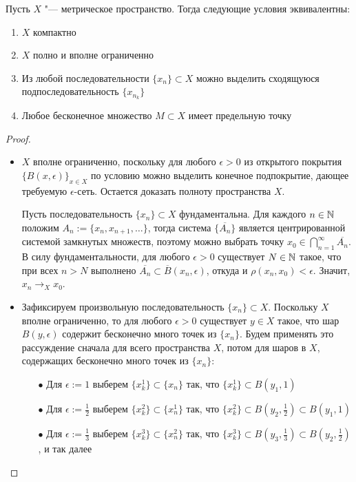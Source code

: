 \begin{theorem}\label{thm3.2}
    Пусть $X$ "--- метрическое пространство. Тогда следующие условия эквивалентны:
    \begin{enumerate}
        \item $X$ компактно
        \item $X$ полно и вполне ограниченно
        \item Из любой последовательности $\{x_n\} \subset X$ можно выделить сходящуюся подпоследовательность $\{x_{n_k}\}$
        \item Любое бесконечное множество $M \subset X$ имеет предельную точку
    \end{enumerate}
\end{theorem}

\begin{proof}~
    \begin{itemize}
        \item{}$X$ вполне ограниченно, поскольку для любого $\epsilon > 0$ из открытого покрытия $\{B(x, \epsilon)\}_{x \in X}$ по условию можно выделить конечное подпокрытие, дающее требуемую $\epsilon$-сеть. Остается доказать полноту пространства $X$.
        
        Пусть последовательность $\{x_n\} \subset X$ фундаментальна. Для каждого $n \in \mathbb{N}$ положим $A_n := \{x_n, x_{n+1}, \dotsc \}$, тогда система $\{\overline{A_n}\}$ является центрированной системой замкнутых множеств, поэтому можно выбрать точку $x_0 \in \bigcap_{n=1}^\infty \overline{A_n}$. В силу фундаментальности, для любого $\epsilon > 0$ существует $N \in \mathbb{N}$ такое, что при всех $n > N$ выполнено $\overline{A_n} \subset \overline B(x_n, \epsilon)$, откуда и $\rho(x_n, x_0) < \epsilon$. Значит, $x_n \to_X x_0$.
        
        \item{}Зафиксируем произвольную последовательность $\{x_n\} \subset X$. Поскольку $X$ вполне ограниченно, то для любого $\epsilon > 0$ существует $y \in X$ такое, что шар $B(y, \epsilon)$ содержит бесконечно много точек из $\{x_n\}$. Будем применять это рассуждение сначала для всего пространства $X$, потом для шаров в $X$, содержащих бесконечно много точек из $\{x_n\}$:
        \begin{itemize}
            \item[$\bullet$] Для $\epsilon := 1$ выберем $\{x^1_k\} \subset \{x_n\}$ так, что $\{x^1_k\} \subset B(y_1, 1)$
            \item[$\bullet$] Для $\epsilon := \frac 12$ выберем $\{x^2_k\} \subset \{x^1_n\}$ так, что $\{x^2_k\} \subset B(y_2, \frac 12) \subset B(y_1, 1)$
            \item[$\bullet$] Для $\epsilon := \frac 13$ выберем $\{x^3_k\} \subset \{x^2_n\}$ так, что $\{x^3_k\} \subset B(y_3, \frac 13) \subset B(y_2, \frac 12)$, и так далее
        \end{itemize}


\end{itemize}
\end{proof}
